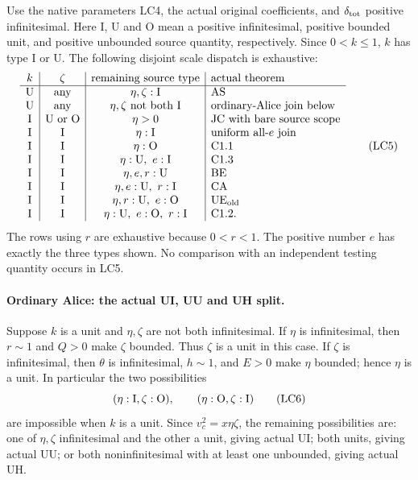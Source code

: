 Use the native parameters LC4, the actual original coefficients, and
\(\delta_{\rm tot}\) positive infinitesimal.
Here I, U and O mean a positive infinitesimal, positive bounded unit,
and positive unbounded source quantity, respectively.
Since \(0<k\leq1\), \(k\) has type I or U.
The following disjoint scale dispatch is exhaustive:
\[
\begin{array}{c|c|c|l}
k&\zeta&\text{remaining source type}&\text{actual theorem}\\ \hline
{\rm U}&\text{any}&\eta,\zeta:{\rm I}&{\rm AS}\\
{\rm U}&\text{any}&\eta,\zeta\text{ not both I}&
                      \text{ordinary-Alice join below}\\
{\rm I}&{\rm U\ or\ O}&\eta>0&
                      {\rm JC}\text{ with bare source scope}\\
{\rm I}&{\rm I}&\eta:{\rm I}&
                      \text{uniform all-}e\text{ join}\\
{\rm I}&{\rm I}&\eta:{\rm O}&{\rm C1.1}\\
{\rm I}&{\rm I}&\eta:{\rm U},\ e:{\rm I}&{\rm C1.3}\\
{\rm I}&{\rm I}&\eta,e,r:{\rm U}&{\rm BE}\\
{\rm I}&{\rm I}&\eta,e:{\rm U},\ r:{\rm I}&{\rm CA}\\
{\rm I}&{\rm I}&\eta,r:{\rm U},\ e:{\rm O}&{\rm UE}_{\rm old}\\
{\rm I}&{\rm I}&\eta:{\rm U},\ e:{\rm O},\ r:{\rm I}
                                                  &{\rm C1.2}.
\end{array}\tag{LC5}
\]
The rows using \(r\) are exhaustive because \(0<r<1\).
The positive number \(e\) has exactly the three types shown.
No comparison with an independent testing quantity occurs in LC5.

\paragraph{Ordinary Alice: the actual UI, UU and UH split.}
Suppose \(k\) is a unit and \(\eta,\zeta\) are not both infinitesimal.
If \(\eta\) is infinitesimal, then \(r\sim1\) and \(Q>0\)
make \(\zeta\) bounded.  Thus \(\zeta\) is a unit in this case.
If \(\zeta\) is infinitesimal, then \(\theta\) is infinitesimal,
\(h\sim1\), and \(E>0\) make \(\eta\) bounded; hence \(\eta\)
is a unit.  In particular the two possibilities
\[
 (\eta:{\rm I},\zeta:{\rm O}),\qquad
 (\eta:{\rm O},\zeta:{\rm I})
\tag{LC6}
\]
are impossible when \(k\) is a unit.
Since \(v_c^2=x\eta\zeta\), the remaining possibilities are:
one of \(\eta,\zeta\) infinitesimal and the other a unit, giving
actual UI; both units, giving actual UU; or both noninfinitesimal
with at least one unbounded, giving actual UH.

